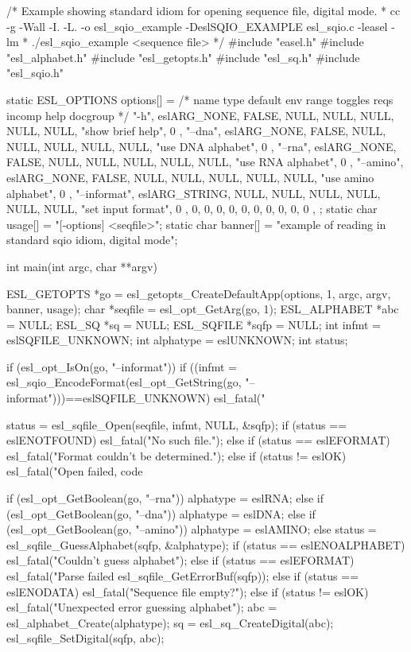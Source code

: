 \begin{cchunk}
/* Example showing standard idiom for opening sequence file, digital mode.
 *  cc -g -Wall -I. -L. -o esl_sqio_example -DeslSQIO_EXAMPLE esl_sqio.c -leasel -lm
 *  ./esl_sqio_example <sequence file>
 */
#include "easel.h"
#include "esl_alphabet.h"
#include "esl_getopts.h"
#include "esl_sq.h"
#include "esl_sqio.h"

static ESL_OPTIONS options[] = {
  /* name          type       default  env  range toggles reqs incomp  help         docgroup */
 { "-h",          eslARG_NONE,  FALSE, NULL, NULL, NULL, NULL, NULL, "show brief help",    0 },
 { "--dna",       eslARG_NONE,  FALSE, NULL, NULL, NULL, NULL, NULL, "use DNA alphabet",   0 },
 { "--rna",       eslARG_NONE,  FALSE, NULL, NULL, NULL, NULL, NULL, "use RNA alphabet",   0 },
 { "--amino",     eslARG_NONE,  FALSE, NULL, NULL, NULL, NULL, NULL, "use amino alphabet", 0 },
 { "--informat",  eslARG_STRING, NULL, NULL, NULL, NULL, NULL, NULL, "set input format",   0 },
 {  0, 0, 0, 0, 0, 0, 0, 0, 0, 0 },
};
static char usage[]  = "[-options] <seqfile>";
static char banner[] = "example of reading in standard sqio idiom, digital mode";

int
main(int argc, char **argv)
{
  ESL_GETOPTS  *go        = esl_getopts_CreateDefaultApp(options, 1, argc, argv, banner, usage);
  char         *seqfile   = esl_opt_GetArg(go, 1);
  ESL_ALPHABET *abc       = NULL;
  ESL_SQ       *sq        = NULL;
  ESL_SQFILE   *sqfp      = NULL;
  int           infmt     = eslSQFILE_UNKNOWN;
  int           alphatype = eslUNKNOWN;
  int           status;

  if (esl_opt_IsOn(go, "--informat")) {
    if ((infmt = esl_sqio_EncodeFormat(esl_opt_GetString(go, "--informat")))==eslSQFILE_UNKNOWN)
      esl_fatal("%
  }

  status = esl_sqfile_Open(seqfile, infmt, NULL, &sqfp);
  if      (status == eslENOTFOUND) esl_fatal("No such file.");
  else if (status == eslEFORMAT)   esl_fatal("Format couldn't be determined.");
  else if (status != eslOK)        esl_fatal("Open failed, code %

  if      (esl_opt_GetBoolean(go, "--rna"))   alphatype = eslRNA;
  else if (esl_opt_GetBoolean(go, "--dna"))   alphatype = eslDNA;
  else if (esl_opt_GetBoolean(go, "--amino")) alphatype = eslAMINO;
  else {
    status = esl_sqfile_GuessAlphabet(sqfp, &alphatype);
    if      (status == eslENOALPHABET)  esl_fatal("Couldn't guess alphabet");
    else if (status == eslEFORMAT)      esl_fatal("Parse failed\n  %
						  esl_sqfile_GetErrorBuf(sqfp));     
    else if (status == eslENODATA)      esl_fatal("Sequence file empty?");
    else if (status != eslOK)           esl_fatal("Unexpected error guessing alphabet");
  }
  abc = esl_alphabet_Create(alphatype);
  sq  = esl_sq_CreateDigital(abc);
  esl_sqfile_SetDigital(sqfp, abc);

}
\end{cchunk}
